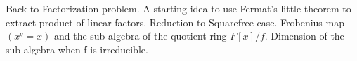 
\noindent

Back to Factorization problem. A starting idea to use Fermat's little theorem to extract product of linear factors. Reduction to Squarefree case.
Frobenius map $(x^q = x)$ and the sub-algebra of the quotient ring $F[x]/f$. Dimension of the sub-algebra when f is irreducible.